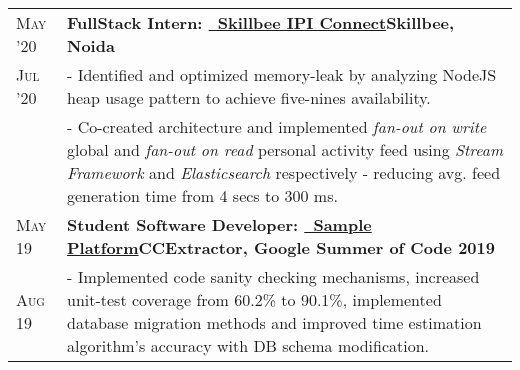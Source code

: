\documentclass[a4paper,10pt]{extarticle} %
\begin{document}
\begin{tabularx}{\linewidth}{ l | X }
  \textsc{May '20} & \textbf{FullStack Intern: {\href{https://skillbee.com/}{\ Skillbee IPI Connect}}}\hfill\textbf{Skillbee, Noida}                                                                                                                                                                                                                              \\
  \textsc{Jul '20} & {- Identified and optimized memory-leak by analyzing NodeJS heap usage pattern to achieve five-nines availability.}                                                                                                                                                                                                                          \\
                   & {- Co-created architecture and implemented \textit{fan-out on write} global and \textit{fan-out on read} personal activity feed using \textit{Stream Framework} and \textit{Elasticsearch} respectively - reducing avg. feed generation time from 4 secs to 300 ms.}                                                                         \\[2mm]

  \textsc{May 19}  & \textbf{Student Software Developer: {\href{https://github.com/CCExtractor/sample-platform}{\ Sample Platform}}}\hfill\textbf{CCExtractor, Google Summer of Code 2019}                                                                                                                                                                        \\
  \textsc{Aug 19}  & {- Implemented code sanity checking mechanisms, increased unit-test coverage from 60.2\% to 90.1\%, implemented database migration methods and improved time estimation algorithm's accuracy with DB schema modification.}                                                                                                                   \\[2mm]


\end{tabularx}
\end{document}
